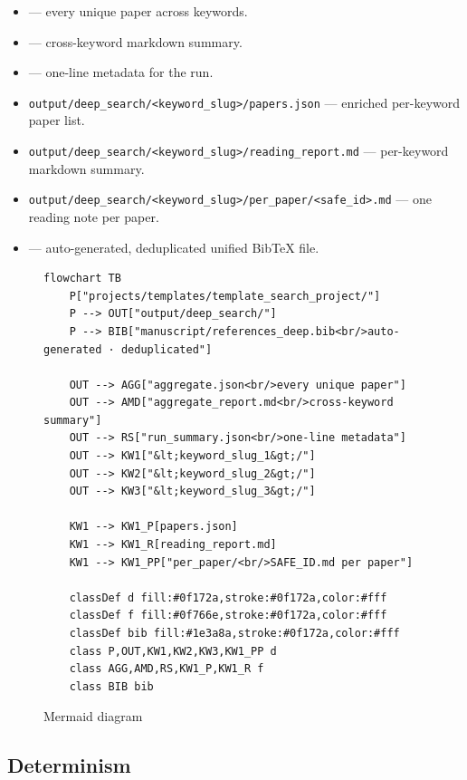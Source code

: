 \documentclass[
]{article}
\providecommand{\tightlist}{%
  \setlength{\itemsep}{0pt}\setlength{\parskip}{0pt}}
\begin{document}
\begin{itemize}
\tightlist
\item
   --- every unique paper
  across keywords.
\item
   --- cross-keyword
  markdown summary.
\item
   --- one-line metadata
  for the run.
\item
  \texttt{output/deep\_search/\textless{}keyword\_slug\textgreater{}/papers.json}
  --- enriched per-keyword paper list.
\item
  \texttt{output/deep\_search/\textless{}keyword\_slug\textgreater{}/reading\_report.md}
  --- per-keyword markdown summary.
\item
  \texttt{output/deep\_search/\textless{}keyword\_slug\textgreater{}/per\_paper/\textless{}safe\_id\textgreater{}.md}
  --- one reading note per paper.
\item
   --- auto-generated,
  deduplicated unified BibTeX file.
\end{itemize}

\begin{figure}[htbp]
\centering
\begin{verbatim}
flowchart TB
    P["projects/templates/template_search_project/"]
    P --> OUT["output/deep_search/"]
    P --> BIB["manuscript/references_deep.bib<br/>auto-generated · deduplicated"]

    OUT --> AGG["aggregate.json<br/>every unique paper"]
    OUT --> AMD["aggregate_report.md<br/>cross-keyword summary"]
    OUT --> RS["run_summary.json<br/>one-line metadata"]
    OUT --> KW1["&lt;keyword_slug_1&gt;/"]
    OUT --> KW2["&lt;keyword_slug_2&gt;/"]
    OUT --> KW3["&lt;keyword_slug_3&gt;/"]

    KW1 --> KW1_P[papers.json]
    KW1 --> KW1_R[reading_report.md]
    KW1 --> KW1_PP["per_paper/<br/>SAFE_ID.md per paper"]

    classDef d fill:#0f172a,stroke:#0f172a,color:#fff
    classDef f fill:#0f766e,stroke:#0f172a,color:#fff
    classDef bib fill:#1e3a8a,stroke:#0f172a,color:#fff
    class P,OUT,KW1,KW2,KW3,KW1_PP d
    class AGG,AMD,RS,KW1_P,KW1_R f
    class BIB bib
\end{verbatim}
\caption{Mermaid diagram}
\end{figure}

\subsection{Determinism}\label{determinism}
\end{document}
